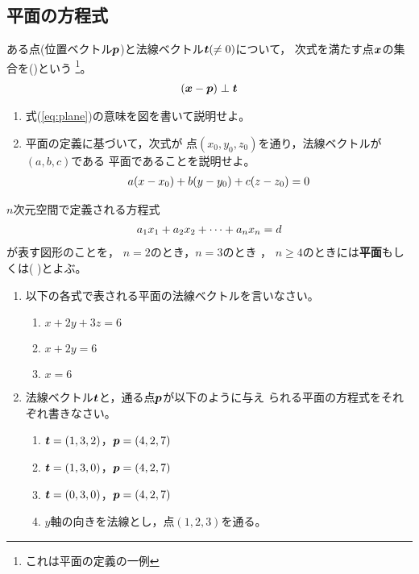 \documentclass[twocolumn,11pt]{jarticle}
\begin{document}
\subsection{平面の方程式\label{sec:plane}}
ある点(位置ベクトル$\boldsymbol{p}$)と法線ベクトル$\boldsymbol{t}(\ne0)$について，
次式を満たす点$\boldsymbol{x}$の集合を()という
\footnote{これは平面の定義の一例}。
\begin{align}
  (\boldsymbol{x}-\boldsymbol{p})\;\bot\;\boldsymbol{t}
  \label{eq:plane}
\end{align}
\question
\begin{enumerate}
\item 式(\ref{eq:plane})の意味を図を書いて説明せよ。
\item 平面の定義に基づいて，次式が
点$\displaystyle(x_0,y_0,z_0)$を通り，法線ベクトルが$(a, b, c)$である
平面であることを説明せよ。
\begin{align}
a(x-x_0)+b(y-y_0)+c(z-z_0)=0\notag
\end{align}
\end{enumerate}

\comment
$n$次元空間で定義される方程式
\begin{align}
a_1x_1+a_2x_2+\cdots+a_nx_n=d\notag
\end{align}
が表す図形のことを，
$n=2$のとき，$n=3$のとき
，
$n\ge 4$のときには\textbf{平面}もしくは(
)とよぶ。

\exercise
\begin{enumerate}
\item 以下の各式で表される平面の法線ベクトルを言いなさい。
  \begin{enumerate}
  \item $x+2y+3z=6$
  \item $x+2y=6$
  \item $x=6$
  \end{enumerate}
\item 法線ベクトル$\boldsymbol{t}$と，通る点$\boldsymbol{p}$が以下のように与え
  られる平面の方程式をそれぞれ書きなさい。
\begin{enumerate}
\item $\boldsymbol{t}=(1,3,2)$，$\boldsymbol{p}=(4,2,7)$
\item $\boldsymbol{t}=(1,3,0)$，$\boldsymbol{p}=(4,2,7)$
\item $\boldsymbol{t}=(0,3,0)$，$\boldsymbol{p}=(4,2,7)$
\item $y$軸の向きを法線とし，点$(1,2,3)$を通る。
\end{enumerate}
\end{enumerate}
\end{document}
